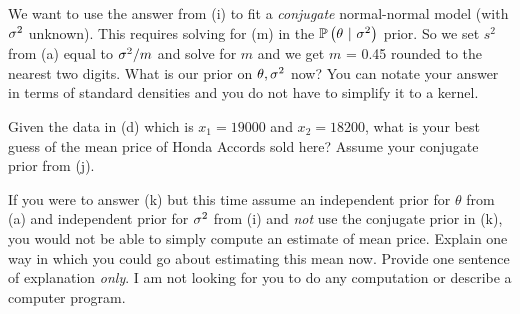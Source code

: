 \documentclass[12pt]{article}
\begin{document}
 We want to use the answer from (i) to fit a \textit{conjugate} normal-normal model (with $\sigma^2$ unknown). This requires solving for (m) in the $\mathbb{P}\left(\theta~|~\sigma^2\right)$ prior. So we set $s^2$ from (a) equal to $\sigma^2 / m$ and solve for $m$ and we get $m$ = 0.45 rounded to the nearest two digits. What is our prior on $\theta, \sigma^2$ now? You can notate your answer in terms of standard densities and you do not have to simplify it to a kernel. 

 Given the data in (d) which is $x_1=19000$ and $x_2 = 18200$, what is your best guess of the mean price of Honda Accords sold here? Assume your conjugate prior from (j).


 If you were to answer (k) but this time assume an independent prior for $\theta$ from (a) and independent prior for $\sigma^2$ from (i) and \textit{not} use the conjugate prior in (k), you would not be able to simply compute an estimate of mean price. Explain one way in which you could go about estimating this mean now. Provide one sentence of explanation \textit{only}. I am not looking for you to do any computation or describe a computer program. 


\eenum
\end{document}
